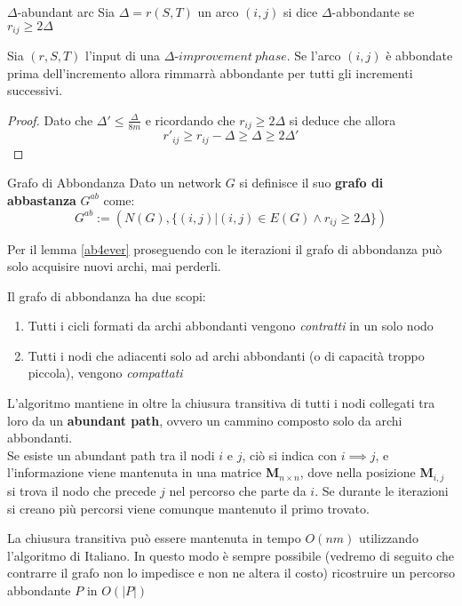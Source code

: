 \begin{definition}{$\Delta$-abundant arc}{}
    Sia $\Delta = r(S,T)$ un arco $(i,j)$ si dice $\Delta$-abbondante se $r_{ij} \ge 2\Delta$ 
     
\end{definition}
\begin{lemma}[label = ab4ever]{}{}
    
    Sia $(r,S,T)$ l'input di una $\Delta\text{-}improvement\ phase$. Se l'arco $(i,j)$ è abbondate prima dell'incremento allora rimmarrà abbondante per tutti gli incrementi successivi.
\end{lemma}
\begin{proof}
    Dato che 
    $\Delta' \le \frac{\Delta}{8m} $ e ricordando che $r_{ij} \ge 2\Delta $ si deduce che 
    allora \[r'_{ij} \ge r_{ij}-\Delta \ge\Delta\ge  2\Delta'\]\QED
\end{proof}

\begin{definition}{Grafo di Abbondanza}{}
    Dato un network $G$ si definisce il suo \textbf{grafo di abbastanza} $G^{ab}$ come: 
    \[G^{ab} := (N(G), \{(i,j)| (i,j)\in E(G)\land r_{ij}\ge 2\Delta\})\]
\end{definition}
\begin{obs}{}{}
    Per il lemma \ref{ab4ever} proseguendo con le iterazioni il grafo di abbondanza può solo acquisire nuovi archi, mai perderli.
\end{obs}

Il grafo di abbondanza ha due scopi: 
\begin{enumerate}
    \item Tutti i cicli formati da archi abbondanti vengono \textit{contratti} in un solo nodo
    \item Tutti i nodi che adiacenti solo ad archi abbondanti (o di capacità troppo piccola), vengono \textit{compattati}
\end{enumerate}
L'algoritmo mantiene in oltre la chiusura transitiva di tutti i nodi collegati tra loro da un \textbf{abundant path}, ovvero un cammino composto solo da archi abbondanti. \\
Se esiste un abundant path tra il nodi $i$ e $j$, ciò si indica con $i\implies j$, e l'informazione viene mantenuta in una matrice \textbf{M}$_{n\times n}$, dove nella posizione 
\textbf{M}$_{i,j}$ si trova il nodo che precede $j$ nel percorso che parte da $i$. Se durante le iterazioni si creano più percorsi viene comunque mantenuto il primo trovato.

La chiusura transitiva può essere mantenuta in tempo $O(nm)$ utilizzando l'algoritmo di Italiano. 
In questo modo è sempre possibile (vedremo di seguito che contrarre il grafo non lo impedisce e non ne altera il costo) ricostruire un percorso abbondante $P$ in $O(|P|)$
\newpage
